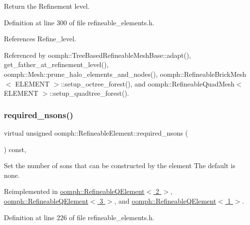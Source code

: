 Return the Refinement level. 



Definition at line 300 of file refineable\+\_\+elements.\+h.



References Refine\+\_\+level.



Referenced by oomph\+::\+Tree\+Based\+Refineable\+Mesh\+Base\+::adapt(), get\+\_\+father\+\_\+at\+\_\+refinement\+\_\+level(), oomph\+::\+Mesh\+::prune\+\_\+halo\+\_\+elements\+\_\+and\+\_\+nodes(), oomph\+::\+Refineable\+Brick\+Mesh$<$ E\+L\+E\+M\+E\+N\+T $>$\+::setup\+\_\+octree\+\_\+forest(), and oomph\+::\+Refineable\+Quad\+Mesh$<$ E\+L\+E\+M\+E\+N\+T $>$\+::setup\+\_\+quadtree\+\_\+forest().

\mbox{\label{classoomph_1_1RefineableElement_a9761852271f6cc9a1a0552ad7e054e4b}} 
\subsubsection{\texorpdfstring{required\+\_\+nsons()}{required\_nsons()}}
{\footnotesize\ttfamily virtual unsigned oomph\+::\+Refineable\+Element\+::required\+\_\+nsons (\begin{DoxyParamCaption}{ }\end{DoxyParamCaption}) const\hspace{0.3cm}{\ttfamily [inline]}, {\ttfamily [virtual]}}



Set the number of sons that can be constructed by the element The default is none. 



Reimplemented in \hyperlink{classoomph_1_1RefineableQElement_3_012_01_4_aac8b41efa9e63826756b390da15644bb}{oomph\+::\+Refineable\+Q\+Element$<$ 2 $>$}, \hyperlink{classoomph_1_1RefineableQElement_3_013_01_4_a1eff24cfc9bead67647d7df95dad97c8}{oomph\+::\+Refineable\+Q\+Element$<$ 3 $>$}, and \hyperlink{classoomph_1_1RefineableQElement_3_011_01_4_a2c57e01f88f507f63a55ef005f11d2ce}{oomph\+::\+Refineable\+Q\+Element$<$ 1 $>$}.



Definition at line 226 of file refineable\+\_\+elements.\+h.



